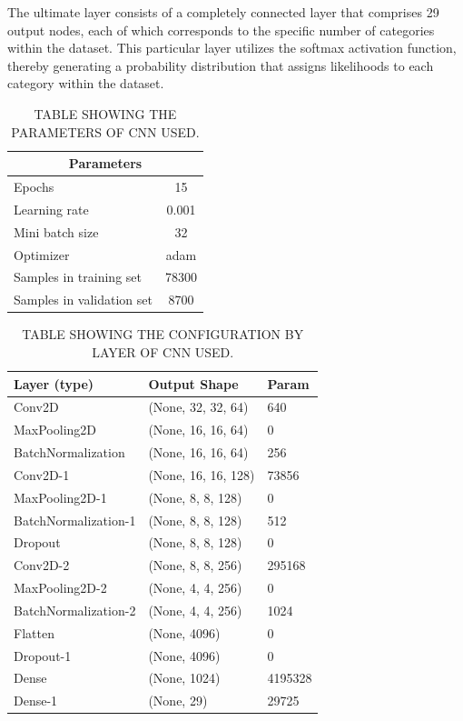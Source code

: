 \documentclass[conference]{IEEEtran}
\begin{document}
The ultimate layer consists of a completely connected layer that comprises 29 output nodes, each of which corresponds to the specific number of categories within the dataset. This particular layer utilizes the softmax activation function, thereby generating a probability distribution that assigns likelihoods to each category within the dataset.

\begin{table}[!t]
\centering
\caption{TABLE SHOWING THE PARAMETERS OF CNN USED.}
\label{tab:CCN-param} 
\begin{tabular}{|l|c|}
\hline
\multicolumn{2}{|c|}{\textbf{Parameters}} \\ \hline
Epochs & 15 \\
Learning rate & 0.001 \\
Mini batch size & 32 \\ 
Optimizer & adam \\
Samples in training set & 78300 \\
Samples in validation set & 8700 \\ \hline
\end{tabular}
\end{table}

\begin{table}[!t]
\centering
\caption{TABLE SHOWING THE CONFIGURATION BY LAYER OF CNN USED.}
\label{tab:CCN-config} 
\begin{tabular}{|l|l|l|}
\hline
\textbf{Layer (type)} & \textbf{Output Shape} & \textbf{Param} \\ \hline
Conv2D & (None, 32, 32, 64) & 640 \\
MaxPooling2D & (None, 16, 16, 64) & 0 \\
BatchNormalization & (None, 16, 16, 64) & 256 \\
Conv2D-1 & (None, 16, 16, 128) & 73856 \\
MaxPooling2D-1 & (None, 8, 8, 128) & 0 \\
BatchNormalization-1 & (None, 8, 8, 128) & 512 \\
Dropout & (None, 8, 8, 128) & 0 \\
Conv2D-2 & (None, 8, 8, 256) & 295168 \\
MaxPooling2D-2 & (None, 4, 4, 256) & 0 \\
BatchNormalization-2 & (None, 4, 4, 256) & 1024 \\
Flatten & (None, 4096) & 0 \\
Dropout-1 & (None, 4096) & 0 \\
Dense & (None, 1024) & 4195328 \\
Dense-1 & (None, 29) & 29725 \\ \hline
\end{tabular}
\end{table}
\end{document}
